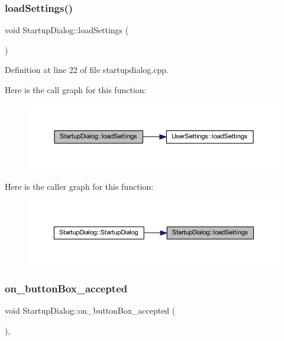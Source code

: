 \subsubsection{\texorpdfstring{loadSettings()}{loadSettings()}}
{\footnotesize\ttfamily void Startup\+Dialog\+::load\+Settings (\begin{DoxyParamCaption}{ }\end{DoxyParamCaption})\hspace{0.3cm}{\ttfamily [private]}}



Definition at line 22 of file startupdialog.\+cpp.

Here is the call graph for this function\+:
\nopagebreak
\begin{figure}[H]
\begin{center}
\leavevmode
\includegraphics[width=350pt]{classStartupDialog_a931800d2e42ff7172a2245252f04c622_cgraph}
\end{center}
\end{figure}
Here is the caller graph for this function\+:
\nopagebreak
\begin{figure}[H]
\begin{center}
\leavevmode
\includegraphics[width=350pt]{classStartupDialog_a931800d2e42ff7172a2245252f04c622_icgraph}
\end{center}
\end{figure}
\mbox{\label{classStartupDialog_acf772dfd42cfc24f058372cb6ee3ae24}} 
\subsubsection{\texorpdfstring{on\_buttonBox\_accepted}{on\_buttonBox\_accepted}}
{\footnotesize\ttfamily void Startup\+Dialog\+::on\+\_\+button\+Box\+\_\+accepted (\begin{DoxyParamCaption}{ }\end{DoxyParamCaption})\hspace{0.3cm}{\ttfamily [private]}, {\ttfamily [slot]}}



